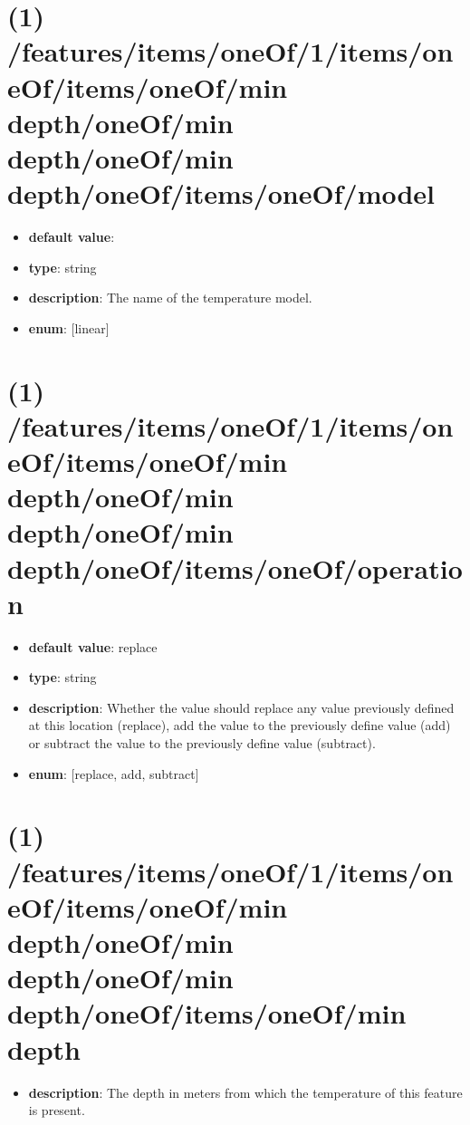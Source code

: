 \section{(1) /features/items/oneOf/1/items/oneOf/items/oneOf/min depth/oneOf/min depth/oneOf/min depth/oneOf/items/oneOf/model}
\begin{itemize}[leftmargin=1em]\item {\bf default value}: 
\item {\bf type}: string
\item {\bf description}: The name of the temperature model.
\item {\bf enum}: [linear]\end{itemize}\section{(1) /features/items/oneOf/1/items/oneOf/items/oneOf/min depth/oneOf/min depth/oneOf/min depth/oneOf/items/oneOf/operation}
\begin{itemize}[leftmargin=1em]\item {\bf default value}: replace
\item {\bf type}: string
\item {\bf description}: Whether the value should replace any value previously defined at this location (replace), add the value to the previously define value (add) or subtract the value to the previously define value (subtract).
\item {\bf enum}: [replace, add, subtract]\end{itemize}\section{(1) /features/items/oneOf/1/items/oneOf/items/oneOf/min depth/oneOf/min depth/oneOf/min depth/oneOf/items/oneOf/min depth}
\begin{itemize}[leftmargin=1em]\item {\bf description}: The depth in meters from which the temperature of this feature is present.
\end{itemize}
